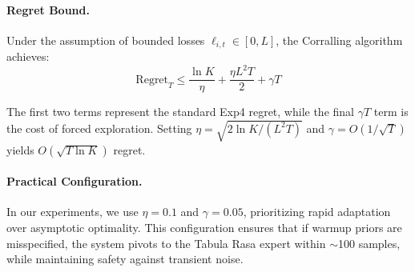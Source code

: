 \paragraph{Regret Bound.} Under the assumption of bounded losses $\ell_{i,t} \in [0, L]$, the Corralling algorithm achieves:
\begin{equation}
    \text{Regret}_T \leq \frac{\ln K}{\eta} + \frac{\eta L^2 T}{2} + \gamma T
\end{equation}

The first two terms represent the standard Exp4 regret, while the final $\gamma T$ term is the cost of forced exploration. Setting $\eta = \sqrt{2\ln K / (L^2 T)}$ and $\gamma = O(1/\sqrt{T})$ yields $O(\sqrt{T \ln K})$ regret.

\paragraph{Practical Configuration.} In our experiments, we use $\eta = 0.1$ and $\gamma = 0.05$, prioritizing rapid adaptation over asymptotic optimality. This configuration ensures that if warmup priors are misspecified, the system pivots to the Tabula Rasa expert within $\sim$100 samples, while maintaining safety against transient noise.

